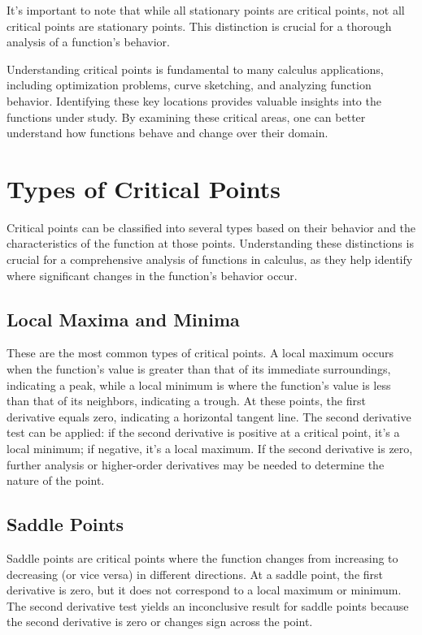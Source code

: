 \documentclass{article}
\begin{document}
It's important to note that while all stationary points are critical points, not all critical points are stationary points. This distinction is crucial for a thorough analysis of a function's behavior.

Understanding critical points is fundamental to many calculus applications, including optimization problems, curve sketching, and analyzing function behavior. Identifying these key locations provides valuable insights into the functions under study. By examining these critical areas, one can better understand how functions behave and change over their domain.

\section{Types of Critical Points}

Critical points can be classified into several types based on their behavior and the characteristics of the function at those points. Understanding these distinctions is crucial for a comprehensive analysis of functions in calculus, as they help identify where significant changes in the function's behavior occur.

\subsection{Local Maxima and Minima}
These are the most common types of critical points. A local maximum occurs when the function's value is greater than that of its immediate surroundings, indicating a peak, while a local minimum is where the function's value is less than that of its neighbors, indicating a trough. At these points, the first derivative equals zero, indicating a horizontal tangent line. The second derivative test can be applied: if the second derivative is positive at a critical point, it's a local minimum; if negative, it's a local maximum. If the second derivative is zero, further analysis or higher-order derivatives may be needed to determine the nature of the point.

\subsection{Saddle Points}
Saddle points are critical points where the function changes from increasing to decreasing (or vice versa) in different directions. At a saddle point, the first derivative is zero, but it does not correspond to a local maximum or minimum. The second derivative test yields an inconclusive result for saddle points because the second derivative is zero or changes sign across the point.
\end{document}
